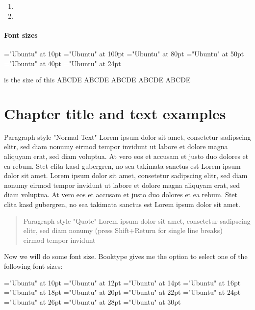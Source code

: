 \begin{enumerate}
\item \blindtext
\item \blindtext
\end{enumerate}

\subsubsection{Font sizes}
\font\FontSizeTenPT="Ubuntu" at 10pt
\font\testhuge="Ubuntu" at 100pt
\font\testbig="Ubuntu" at 80pt
\font\testnormal="Ubuntu" at 50pt
\font\testsmall="Ubuntu" at 40pt
\font\testtiny="Ubuntu" at 24pt

\offinterlineskip\testnormal

{\FontSizeTenPT 10pt is the size of this}
{\testhuge ABCDE}
\vskip1pt
{\testbig ABCDE}
\vskip1pt
ABCDE
\vskip1pt
{\testsmall ABCDE}
\vskip1pt
{\testtiny ABCDE}

\normalsize 
\chapter{Chapter title and text examples}
Paragraph style "Normal Text" Lorem ipsum dolor sit amet,
consetetur sadipscing elitr, sed diam nonumy eirmod tempor invidunt
ut labore et dolore magna aliquyam erat, sed diam voluptua. At vero
eos et accusam et justo duo dolores et ea rebum. Stet clita kasd
gubergren, no sea takimata sanctus est Lorem ipsum dolor sit amet.
Lorem ipsum dolor sit amet, consetetur sadipscing elitr, sed diam
nonumy eirmod tempor invidunt ut labore et dolore magna aliquyam
erat, sed diam voluptua. At vero eos et accusam et justo duo
dolores et ea rebum. Stet clita kasd gubergren, no sea takimata
sanctus est Lorem ipsum dolor sit amet.

\begin{quote}
Paragraph style "Quote" Lorem ipsum dolor sit
amet, consetetur sadipscing elitr, sed diam nonumy (press
Shift+Return for single line breaks)\\
eirmod tempor invidunt
\end{quote}

Now we will do some font size. Booktype gives me the
option to select one of the following font sizes:

\font\FontSizeTenPT="Ubuntu" at 10pt
\font\FontSizeTwelvePT="Ubuntu" at 12pt
\font\FontSizeFourteenPT="Ubuntu" at 14pt
\font\FontSizeSixteenPT="Ubuntu" at 16pt
\font\FontSizeEighteenPT="Ubuntu" at 18pt
\font\FontSizeTwentyPT="Ubuntu" at 20pt
\font\FontSizeTwentytwoPT="Ubuntu" at 22pt
\font\FontSizeTwentyfourPT="Ubuntu" at 24pt
\font\FontSizeTwentysixPT="Ubuntu" at 26pt
\font\FontSizeTwentyeightPT="Ubuntu" at 28pt
\font\FontSizeThirtyPT="Ubuntu" at 30pt

